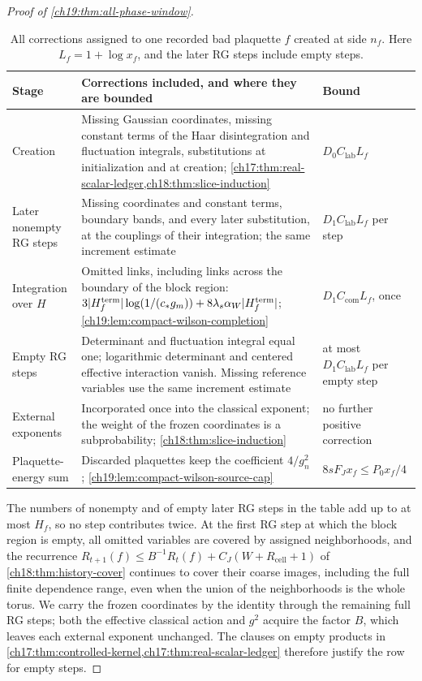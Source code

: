 \begin{proof}[Proof of \cref{ch19:thm:all-phase-window}]
\begin{table}[htbp]
\centering\small
\caption{All corrections assigned to one recorded bad plaquette $f$ created at side $n_f$. Here $L_f=1+\log x_f$, and the later RG steps include empty steps.}
\label{ch19:tab:activation-charges}
\begin{tabular}{@{}>{\raggedright\arraybackslash}p{}
>{\raggedright\arraybackslash}p{}
>{\raggedright\arraybackslash}p{}@{}}
\toprule
Stage & Corrections included, and where they are bounded & Bound \\
\midrule
Creation & Missing Gaussian coordinates, missing constant terms of the Haar disintegration and fluctuation integrals, substitutions at initialization and at creation; \cref{ch17:thm:real-scalar-ledger,ch18:thm:slice-induction} & $D_0C_{\mathrm{lab}}L_f$ \\
Later nonempty RG steps & Missing coordinates and constant terms, boundary bands, and every later substitution, at the couplings of their integration; the same increment estimate & $D_1C_{\mathrm{lab}}L_f$ per step \\
Integration over $H$ & Omitted links, including links across the boundary of the block region: $3\lvert H_f^{\mathrm{term}}\rvert\log(1/(c_*g_m))+8\lambda_s\alpha_W\lvert H_f^{\mathrm{term}}\rvert$; \cref{ch19:lem:compact-wilson-completion} & $D_1C_{\mathrm{com}}L_f$, once \\
Empty RG steps & Determinant and fluctuation integral equal one; logarithmic determinant and centered effective interaction vanish. Missing reference variables use the same increment estimate & at most $D_1C_{\mathrm{lab}}L_f$ per empty step \\
External exponents & Incorporated once into the classical exponent; the weight of the frozen coordinates is a subprobability; \cref{ch18:thm:slice-induction} & no further positive correction \\
Plaquette-energy sum & Discarded plaquettes keep the coefficient $4/g_n^2$; \cref{ch19:lem:compact-wilson-source-cap} & $8sF_Jx_f\le P_0x_f/4$ \\
\bottomrule
\end{tabular}
\end{table}

The numbers of nonempty and of empty later RG steps in the table add up to at most $H_f$, so no step contributes twice. At the first RG step at which the block region is empty, all omitted variables are covered by assigned neighborhoods, and the recurrence $R_{t+1}(f)\le B^{-1}R_t(f)+C_J(W+R_{\mathrm{cell}}+1)$ of \cref{ch18:thm:history-cover} continues to cover their coarse images, including the full finite dependence range, even when the union of the neighborhoods is the whole torus. We carry the frozen coordinates by the identity through the remaining full RG steps; both the effective classical action and $g^2$ acquire the factor $B$, which leaves each external exponent unchanged. The clauses on empty products in \cref{ch17:thm:controlled-kernel,ch17:thm:real-scalar-ledger} therefore justify the row for empty steps.


\end{proof}
